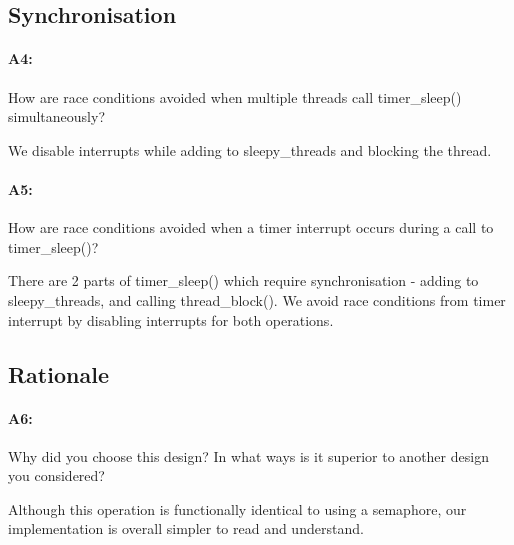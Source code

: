 \documentclass[11pt]{article}
\begin{document}
\subsection{Synchronisation}
\paragraph{A4:}
How are race conditions avoided when multiple threads call timer\_sleep() simultaneously?

We disable interrupts while adding to sleepy\_threads and blocking the thread.

\paragraph{A5:}
How are race conditions avoided when a timer interrupt occurs during a call to timer\_sleep()?

There are 2 parts of timer\_sleep() which require synchronisation - adding to sleepy\_threads, and calling thread\_block(). We avoid race conditions from timer interrupt by disabling interrupts for both operations.

\subsection{Rationale}
\paragraph{A6:}
Why did you choose this design? In what ways is it superior to another design you considered?

Although this operation is functionally identical to using a semaphore, our implementation is overall simpler to read and understand.
\end{document}
